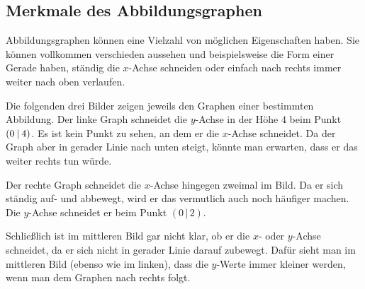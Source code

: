\documentclass[../../main.tex]{subfiles}
\begin{document}
\subsection{Merkmale des Abbildungsgraphen}

Abbildungsgraphen können eine Vielzahl von möglichen Eigenschaften haben. Sie können vollkommen verschieden aussehen und beispielsweise die Form einer Gerade haben, ständig die $x$-Achse schneiden oder einfach nach rechts immer weiter nach oben verlaufen.

\begin{example}{}
    Die folgenden drei Bilder zeigen jeweils den Graphen einer bestimmten Abbildung. Der linke Graph schneidet die $y$-Achse in der Höhe $4$ beim Punkt $\left(0 \:\middle|\: 4\right)$. Es ist kein Punkt zu sehen, an dem er die $x$-Achse schneidet. Da der Graph aber in gerader Linie nach unten steigt, könnte man erwarten, dass er das weiter rechts tun würde.
    \begin{multicols}{3}
        \centering
        
        
    \end{multicols}
    Der rechte Graph schneidet die $x$-Achse hingegen zweimal im Bild. Da er sich ständig auf- und abbewegt, wird er das vermutlich auch noch häufiger machen. Die $y$-Achse schneidet er beim Punkt $(0\,|\,2)$.
    
    Schließlich ist im mittleren Bild gar nicht klar, ob er die $x$- oder $y$-Achse schneidet, da er sich nicht in gerader Linie darauf zubewegt. Dafür sieht man im mittleren Bild (ebenso wie im linken), dass die $y$-Werte immer kleiner werden, wenn man dem Graphen nach rechts folgt.
\end{example}
\end{document}
